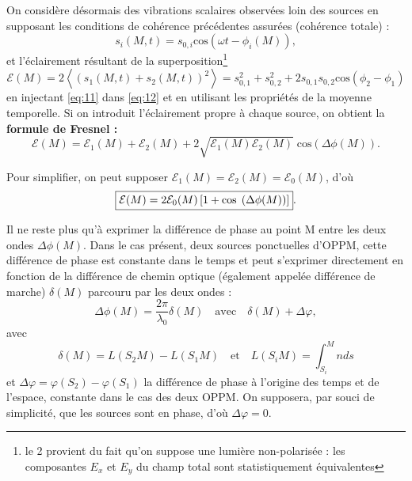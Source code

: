 \documentclass[11pt,a4paper]{report}
\begin{document}
On considère désormais des vibrations scalaires observées loin des sources en supposant les conditions de cohérence précédentes assurées (cohérence totale) :
\begin{equation}
	s_i(M,t) = s_{0,i} \text{cos}\left(\omega t - \phi_{i}(M) \right),
	\label{eq:11}
\end{equation}
et l'éclairement résultant de la superposition\footnote{le 2 provient du fait qu'on suppose une lumière non-polarisée : les composantes $E_x$ et $E_y$ du champ total sont statistiquement équivalentes} 
\begin{equation}
	\mathcal{E}(M) = 2\left\langle (s_1(M,t) + s_2(M,t))^2\right\rangle 
	= s_{0,1}^2 + s_{0,2}^2 + 2 s_{0,1} s_{0,2} \text{cos}\left(\phi_2-\phi_1\right)
	\label{eq:12}
\end{equation}
en injectant \eqref{eq:11} dans \eqref{eq:12} et en utilisant les propriétés de la moyenne temporelle. Si on introduit l'éclairement propre à chaque source, on obtient la \textbf{formule de Fresnel :}
\begin{equation}
	\boxed{\mathcal{E}(M) = \mathcal{E}_1(M) + \mathcal{E}_2(M) 
	+ 2\sqrt{\mathcal{E}_1(M)\mathcal{E}_2(M)}\; \text{cos}\left(\Delta \phi (M)\right)}.
\end{equation}

Pour simplifier, on peut supposer $\mathcal{E}_1(M) = \mathcal{E}_2(M) = \mathcal{E}_0(M)$, d'où
\begin{equation}
	\boxed{\mathcal{E}(M) = 2\mathcal{E}_0(M)\left[1 
	+ \text{cos}\;\left(\Delta\phi(M)\right)\right]}.\\
\end{equation}
 
Il ne reste plus qu'à exprimer la différence de phase au point M entre les deux ondes $\Delta\phi(M)$. Dans le cas présent, deux sources ponctuelles d'OPPM, cette différence de phase est constante dans le temps et peut s'exprimer directement en fonction de la différence de chemin optique (également appelée différence de marche) $\delta(M)$ parcouru par les deux ondes :
\begin{equation}
	\boxed{\Delta \phi (M) = \frac{2\pi}{\lambda_0}\delta(M)} \quad\text{avec}\quad
	\delta(M) + \Delta\varphi,
\end{equation}
avec
\begin{equation}
	\delta(M) = L\left(S_2M\right) - L\left(S_1M\right) \quad\text{et}\quad	L(S_i M) 
	= \int_{S_i}^M nds
\end{equation}
et $\Delta\varphi = \varphi(S_2) - \varphi(S_1)$ la différence de phase à l'origine des temps et de l'espace, constante dans le cas des deux OPPM. On supposera, par souci de simplicité, que les sources sont en phase, d'où $\Delta\varphi = 0$.\\
\end{document}
